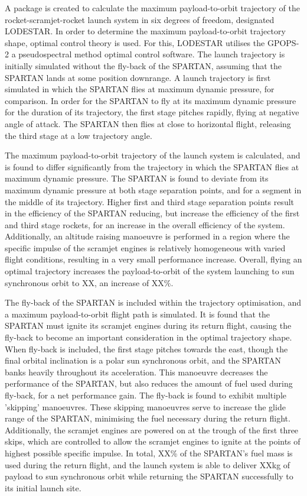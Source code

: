  A package is created to calculate the maximum payload-to-orbit trajectory of the rocket-scramjet-rocket launch system in six degrees of freedom, designated LODESTAR.
 In order to determine the maximum payload-to-orbit trajectory shape, optimal control theory is used. For this, LODESTAR utilises the GPOPS-2 a pseudospectral method optimal control software. 
 The launch trajectory is initially simulated without the fly-back of the SPARTAN, assuming that the SPARTAN lands at some position downrange. A launch trajectory is first simulated in which the SPARTAN flies at maximum dynamic pressure, for comparison. In order for the SPARTAN to fly at its maximum dynamic pressure for the duration of its trajectory, the first stage pitches rapidly, flying at negative angle of attack. The SPARTAN then flies at close to horizontal flight, releasing the third stage at a low trajectory angle. 
 
The maximum payload-to-orbit trajectory of the launch system is calculated, and is found to differ significantly from the trajectory in which the SPARTAN flies at maximum dynamic pressure. 
 The SPARTAN is found to deviate from its maximum dynamic pressure at both stage separation points, and for a segment in the middle of its trajectory.
 Higher first and third stage separation points result in the efficiency of the SPARTAN reducing, but increase the efficiency of the first and third stage rockets, for an increase in the overall efficiency of the system. 
  Additionally, an altitude raising manoeuvre is performed in a region where the specific impulse of the scramjet engines is relatively homogeneous with varied flight conditions, resulting in a very small performance increase. Overall, flying an optimal trajectory increases the payload-to-orbit of the system launching to sun synchronous orbit to XX, an increase of XX\%.  
 
 
 The fly-back of the SPARTAN is included within the trajectory optimisation, and a maximum payload-to-orbit flight path is simulated. 
 It is found that the SPARTAN must ignite its scramjet engines during its return flight, causing the fly-back to become an important consideration in the optimal trajectory shape. When fly-back is included, the first stage pitches towards the east, though the final orbital inclination is a polar sun synchronous orbit, and the SPARTAN banks heavily throughout its acceleration. This manoeuvre decreases the performance of the SPARTAN, but also reduces the amount of fuel used during fly-back, for a net performance gain. 
The fly-back is found to exhibit multiple 'skipping' manoeuvres. These skipping manoeuvres serve to increase the glide range of the SPARTAN, minimising the fuel necessary during the return flight. Additionally, the scramjet engines are powered on at the trough of the first three skips, which are controlled to allow the scramjet engines to ignite at the points of highest possible specific impulse. In total, XX\% of the SPARTAN's fuel mass is used during the return flight, and the launch system is able to deliver XXkg of payload to sun synchronous orbit while returning the SPARTAN successfully to its initial launch site.

